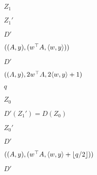 \documentclass[10pt]{book}
\begin{document}
\begin{mdSnippets}
\begin{mdInlineSnippet}[c6847901dd09a7efd9dd75477a521329]%
$Z_1$\end{mdInlineSnippet}%
\begin{mdInlineSnippet}%
$Z_1'$\end{mdInlineSnippet}%
\begin{mdInlineSnippet}[0232f27be40b2b647f260050dd308eb8]%
$D'$\end{mdInlineSnippet}%
\begin{mdInlineSnippet}%
$((A,y), (w^\top A, \langle w,y \rangle))$\end{mdInlineSnippet}%
\begin{mdInlineSnippet}[0232f27be40b2b647f260050dd308eb8]%
$D'$\end{mdInlineSnippet}%
\begin{mdInlineSnippet}[c4bb7aa932c8dc3750f4cdac563381e3]%
$((A,y), 2w^\top A, 2\langle w,y \rangle + 1)$\end{mdInlineSnippet}%
\begin{mdInlineSnippet}[7694f4a66316e53c8cdd9d9954bd611d]%
$q$\end{mdInlineSnippet}%
\begin{mdInlineSnippet}[593d9b96ceba775ac243cb137dd63e4b]%
$Z_0$\end{mdInlineSnippet}%
\begin{mdInlineSnippet}[be06de8cf33017a369fda2d48475f1f0]%
$D'(Z_1') = D(Z_0)$\end{mdInlineSnippet}%
\begin{mdInlineSnippet}[db9e33ed5e5e8294b8693f8cc6334941]%
$Z_0'$\end{mdInlineSnippet}%
\begin{mdInlineSnippet}[0232f27be40b2b647f260050dd308eb8]%
$D'$\end{mdInlineSnippet}%
\begin{mdInlineSnippet}%
$((A,y), (w^\top A, \langle w,y \rangle + \lfloor q/2 \rfloor))$\end{mdInlineSnippet}%
\begin{mdInlineSnippet}[0232f27be40b2b647f260050dd308eb8]%
$D'$\end{mdInlineSnippet}%

\end{mdSnippets}
\end{document}
